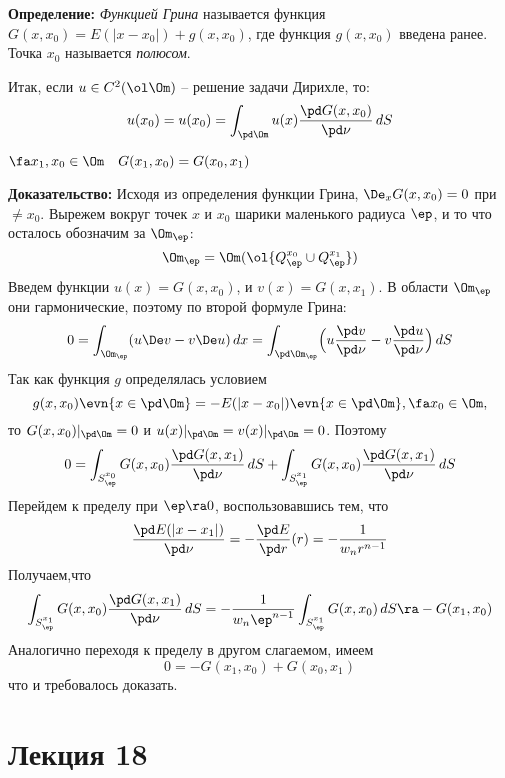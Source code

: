 \documentclass[a4paper,draft]{article}
\begin{document}
\textbf{Определение:} \emph{Функцией Грина} называется функция
$G(x,x_0)=E(|x-x_0|)+g(x,x_0)$, где функция $g(x,x_0)$ введена
ранее. Точка $x_0$ называется \emph{полюсом}.

Итак, если $u\in C^2(\ol\Om)$ -- решение задачи Дирихле,
то:
$$
u(x_0)=u(x_0)=\int_{\pd\Om}u(x) \frac{\pd
G(x,x_0)}{\pd\nu}\, dS
$$

\begin{lemma}
$\fa x_1,x_0 \in \Om \quad G(x_1,x_0)=G(x_0,x_1)$
\end{lemma}
\textbf{Доказательство:} Исходя из определения функции Грина,
$\De_x G(x,x_0)=0$ при $\neq x_0$. Вырежем вокруг точек $x$ и
$x_0$ шарики маленького радиуса $\ep$, и то что осталось
обозначим за $\Om_\ep$:
$$
\Om_\ep=\Om \\(\ol{Q_\ep^{x_0}\cup
Q_\ep^{x_1}})
$$
Введем функции $u(x)=G(x,x_0)$, и $v(x)=G(x,x_1)$. В области
$\Om_\ep$ они гармонические, поэтому по второй формуле
Грина:
$$
0=\int_{\Om_\ep} (u\De v- v\De u)\,
dx=\int_{\pd \Om_\ep} \Bigl(u \frac {\pd
v}{\pd \nu}-v \frac {\pd u}{\pd \nu}\Bigr) \, dS
$$
Так как функция $g$ определялась условием
$$g(x,x_0)\evn{x\in \pd\Om}=-E(|x-x_0|)\evn{x\in \pd\Om}, \fa x_0 \in \Om,$$
то $G(x,x_0)|_{\pd\Om}=0$ и $u(x)|_{\pd\Om}=v(x)|_{\pd\Om}=0$. Поэтому
$$
0=\int_{S_\ep^{x_0}}G(x,x_0)\frac{\pd
G(x,x_1)}{\pd\nu}\,dS+\int_{S_\ep^{x_1}}G(x,x_0)\frac{\pd
G(x,x_1)}{\pd\nu}\,dS
$$
Перейдем к пределу при $\ep\ra 0$,
воспользовавшись тем, что
$$
\frac{\pd E(|x-x_1|)}{\pd\nu}= -\frac{\pd
E}{\pd r}(r)=-\frac 1{w_n r^{n-1}}
$$
Получаем,что
$$
\int_{S_\ep^{x_1}}G(x,x_0)\frac{\pd
G(x,x_1)}{\pd\nu}\,dS=-\frac 1{w_n \ep^{n-1}}
\int_{S_\ep^{x_1}} G(x,x_0)\, dS\ra - G (x_1,x_0)
$$
Аналогично переходя к пределу в другом слагаемом, имеем
$$
0=-G(x_1,x_0)+G(x_0,x_1)
$$
что и требовалось доказать.
















\section{Лекция 18}
\end{document}
